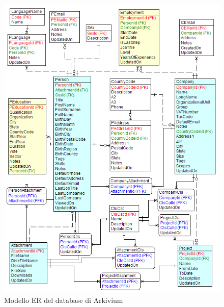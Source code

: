 \vspace{1em}
\begin{figure}[H]
	\centering
	\includegraphics[scale=1]{../images/03_1_ER_v2}
	\caption[Modello ER semplificato del database di Arkivium]{Modello ER del database di Arkivium}
	\label{fig:ermodel}
\end{figure}

\vspace{2em}
\pagebreak

